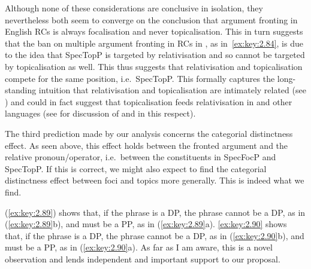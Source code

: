 \documentclass[output=paper]{langsci/langscibook}
\begin{document}
\ea\label{ex:key:2.87}
    \z
\z
\ea\label{ex:key:2.88}
    \z
\z
Although none of these considerations are conclusive in isolation, they
nevertheless both seem to converge on the conclusion that argument fronting in
English \glspl{RC} is always focalisation and never topicalisation. This in turn
suggests that the ban on multiple argument fronting in \glspl{RC} in , as
in~\eqref{ex:key:2.84}, is due to the idea that SpecTopP is targeted by
relativisation and so cannot be targeted by topicalisation as well. This thus
suggests that relativisation and topicalisation compete for the same position,
i.e.\ SpecTopP\@.  This formally captures the long-standing intuition that
relativisation and topicalisation are intimately related (see
\citealt{Abels2012a,Bianchi1999,Kuno1973,Kuno1976,Williams2011}) and could in
fact suggest that topicalisation feeds relativisation in  and other
languages (see \citealt{Douglas2016} for discussion of  and
 in this respect).

The third prediction made by our analysis concerns the categorial distinctness
effect. As seen above, this effect holds between the fronted argument and the
relative pronoun/operator, i.e.\ between the constituents in SpecFocP and
SpecTopP\@. If this is correct, we might also expect to find the categorial
distinctness effect between foci and topics more generally. This is indeed what
we find.

\ea\label{ex:key:2.89}
    \z
\z
\ea\label{ex:key:2.90}
    \z
\z
(\ref{ex:key:2.89}) shows that, if the  phrase is a DP, the
 phrase cannot be a DP, as in (\ref{ex:key:2.89}b), and must be a
PP, as in (\ref{ex:key:2.89}a). \eqref{ex:key:2.90} shows that, if the
 phrase is a DP, the  phrase cannot be a DP, as in
(\ref{ex:key:2.90}b), and must be a PP, as in (\ref{ex:key:2.90}a). As far as I
am aware, this is a novel observation and lends independent and important
support to our proposal.
\end{document}
